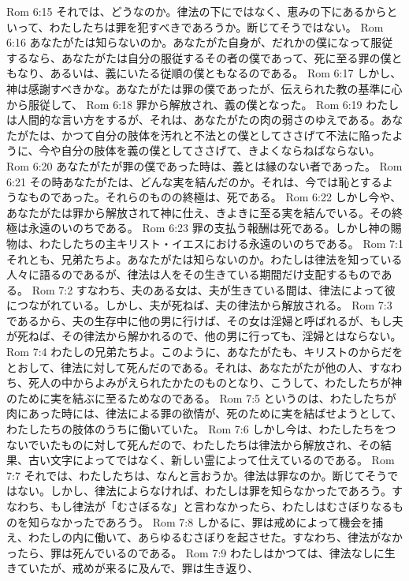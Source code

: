 Rom 6:15  それでは、どうなのか。律法の下にではなく、恵みの下にあるからといって、わたしたちは罪を犯すべきであろうか。断じてそうではない。
Rom 6:16  あなたがたは知らないのか。あなたがた自身が、だれかの僕になって服従するなら、あなたがたは自分の服従するその者の僕であって、死に至る罪の僕ともなり、あるいは、義にいたる従順の僕ともなるのである。
Rom 6:17  しかし、神は感謝すべきかな。あなたがたは罪の僕であったが、伝えられた教の基準に心から服従して、
Rom 6:18  罪から解放され、義の僕となった。
Rom 6:19  わたしは人間的な言い方をするが、それは、あなたがたの肉の弱さのゆえである。あなたがたは、かつて自分の肢体を汚れと不法との僕としてささげて不法に陥ったように、今や自分の肢体を義の僕としてささげて、きよくならねばならない。
Rom 6:20  あなたがたが罪の僕であった時は、義とは縁のない者であった。
Rom 6:21  その時あなたがたは、どんな実を結んだのか。それは、今では恥とするようなものであった。それらのものの終極は、死である。
Rom 6:22  しかし今や、あなたがたは罪から解放されて神に仕え、きよきに至る実を結んでいる。その終極は永遠のいのちである。
Rom 6:23  罪の支払う報酬は死である。しかし神の賜物は、わたしたちの主キリスト・イエスにおける永遠のいのちである。
Rom 7:1  それとも、兄弟たちよ。あなたがたは知らないのか。わたしは律法を知っている人々に語るのであるが、律法は人をその生きている期間だけ支配するものである。
Rom 7:2  すなわち、夫のある女は、夫が生きている間は、律法によって彼につながれている。しかし、夫が死ねば、夫の律法から解放される。
Rom 7:3  であるから、夫の生存中に他の男に行けば、その女は淫婦と呼ばれるが、もし夫が死ねば、その律法から解かれるので、他の男に行っても、淫婦とはならない。
Rom 7:4  わたしの兄弟たちよ。このように、あなたがたも、キリストのからだをとおして、律法に対して死んだのである。それは、あなたがたが他の人、すなわち、死人の中からよみがえられたかたのものとなり、こうして、わたしたちが神のために実を結ぶに至るためなのである。
Rom 7:5  というのは、わたしたちが肉にあった時には、律法による罪の欲情が、死のために実を結ばせようとして、わたしたちの肢体のうちに働いていた。
Rom 7:6  しかし今は、わたしたちをつないでいたものに対して死んだので、わたしたちは律法から解放され、その結果、古い文字によってではなく、新しい霊によって仕えているのである。
Rom 7:7  それでは、わたしたちは、なんと言おうか。律法は罪なのか。断じてそうではない。しかし、律法によらなければ、わたしは罪を知らなかったであろう。すなわち、もし律法が「むさぼるな」と言わなかったら、わたしはむさぼりなるものを知らなかったであろう。
Rom 7:8  しかるに、罪は戒めによって機会を捕え、わたしの内に働いて、あらゆるむさぼりを起させた。すなわち、律法がなかったら、罪は死んでいるのである。
Rom 7:9  わたしはかつては、律法なしに生きていたが、戒めが来るに及んで、罪は生き返り、
